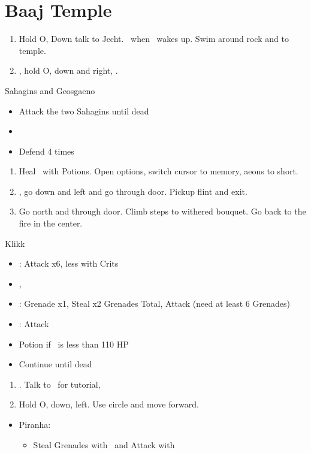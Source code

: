 \chapter{Baaj Temple}

\begin{enumerate}
  \item Hold O, Down talk to Jecht. \sd \ when \tidus \ wakes up. Swim around rock and to temple.
  \item \cs, hold O, down and right, \cs.
\end{enumerate}
\begin{battle}{Sahagins and Geosgaeno}
  \begin{itemize}
    \item Attack the two Sahagins until dead
    \item \cs[0:30]
    \item Defend 4 times
  \end{itemize}
\end{battle}
\begin{enumerate}[resume]
  \item Heal \tidus \ with Potions. Open options, switch cursor to memory, aeons to short.
  \item \cs, go down and left and go through door. Pickup flint and exit.
  \item Go north and through door. Climb steps to withered bouquet. Go back to the fire in the center. \cs[2:10]
\end{enumerate}
\begin{battle}[1500]{Klikk}
  \begin{itemize}
    \item \tidus: Attack x6, less with Crits
    \item \cs, \sd
    \item \rikku: Grenade x1, Steal x2 Grenades Total, Attack (need at least 6 Grenades)
    \item \tidus: Attack
    \item Potion if \tidus \ is less than 110 HP
    \item Continue until dead
  \end{itemize}
\end{battle}
\begin{enumerate}[resume]
  \item \cs[2:30]. Talk to \rikku \ for tutorial, \sd
  \item Hold O, down, left. Use circle and move forward.
\end{enumerate}
\begin{encounters}
  \begin{itemize}
    \item Piranha:
          \begin{itemize}
            \item Steal Grenades with \rikku \ and Attack with \tidus
          \end{itemize}
  \end{itemize}
\end{encounters}
